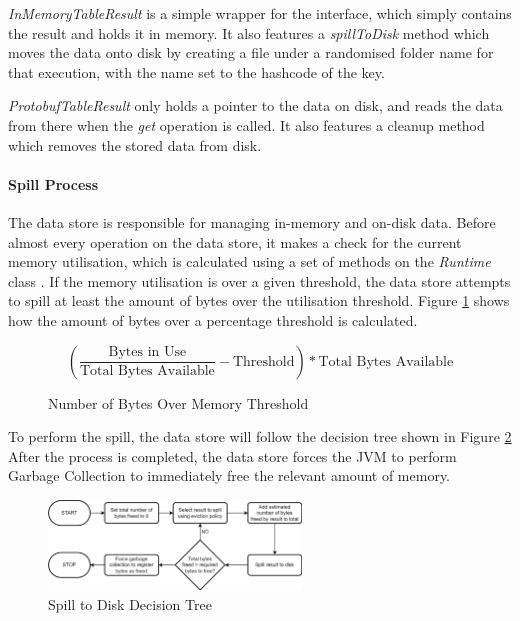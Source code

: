 \textit{InMemoryTableResult} is a simple wrapper for the interface, which simply contains the result and holds it in memory. It also features a \textit{spillToDisk} method which moves the data onto disk by creating a file under a randomised folder name for that execution, with the name set to the hashcode of the key. 

\textit{ProtobufTableResult} only holds a pointer to the data on disk, and reads the data from there when the \textit{get} operation is called. It also features a cleanup method which removes the stored data from disk.

\paragraph{Spill Process}
The data store is responsible for managing in-memory and on-disk data. Before almost every operation on the data store, it makes a check for the current memory utilisation, which is calculated using a set of methods on the \textit{Runtime} class . If the memory utilisation is over a given threshold, the data store attempts to spill at least the amount of bytes over the utilisation threshold. Figure \ref{fig:bytes-over-memory-threshold} shows how the amount of bytes over a percentage threshold is calculated.

\begin{figure}[h]
	\centering
	\[ \left( \frac{\text{Bytes in Use}}{\text{Total Bytes Available}} - \text{Threshold} \right) * \text{Total Bytes Available} \]
	\caption{Number of Bytes Over Memory Threshold}
	\label{fig:bytes-over-memory-threshold}
\end{figure}

To perform the spill, the data store will follow the decision tree shown in Figure \ref{fig:spill-to-disk-process} After the process is completed, the data store forces the JVM to perform Garbage Collection to immediately free the relevant amount of memory.

\begin{figure}[h]
	\centering
	\includegraphics[width=0.6\textwidth]{chapters/diagrams/implementation/spill-to-disk-process}
	\caption{Spill to Disk Decision Tree}
	\label{fig:spill-to-disk-process}
\end{figure}

